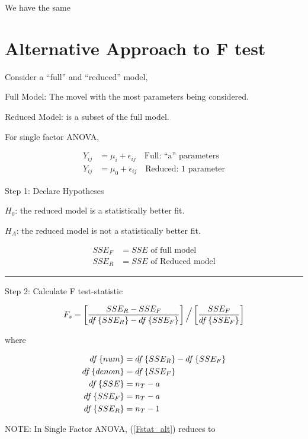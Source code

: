 \documentclass[10pt]{article}
\newcommand{\define}[1]{\colorbox{Thistle2}{#1}}
\newcommand{\emphas}[1]{\colorbox{DarkSeaGreen2}{#1}}
\newcommand{\mean}[1]{\mu_{#1}}
\newcommand{\err}[1]{\epsilon_{#1}}
\newcommand{\drawline}{\noindent\rule{\linewidth}{0.1pt}}
\begin{document}
\begin{multicols}{3}
    We have the same 

    \section{Alternative Approach to F test}

    Consider a ``full'' and ``reduced'' model,

    \define{Full Model:} The movel with the most parameters being considered.

    \define{Reduced Model:} is a subset of the full model.

    For single factor ANOVA, 

    \begin{align}
        Y_{ij} & = \mean{i} + \err{ij} \quad \text{Full: ``a'' parameters} \\
        Y_{ij} & = \mean{0} + \err{ij} \quad \text{Reduced: 1 parameter}
    \end{align}

    Step 1: Declare Hypotheses

    $H_0$: the reduced model is a statistically better fit.

    $H_A$: the reduced model is not a statistically better fit.

    \begin{align}
        SSE_F & = SSE \text{ of full model} \\
        SSE_R & = SSE \text{ of Reduced model} 
    \end{align}

    \drawline

    Step 2: Calculate F test-statistic

    \begin{equation}\label{Fstat_alt}
        F_s = \left[\frac{SSE_R - SSE_F}{df\left\{SSE_R\right\} - df\left\{SSE_F\right\}}\right] \Big/ \left[\frac{SSE_F}{df\left\{SSE_F\right\}}\right]
    \end{equation}

    where 

    \begin{align}
        df\left\{num\right\} & = df\left\{SSE_R\right\} - df\left\{SSE_F\right\} \\
        df\left\{denom\right\} & = df\left\{SSE_F\right\} \\
        df\left\{SSE\right\} & = n_T - a \\
        df\left\{SSE_F\right\} & = n_T - a \\
        df\left\{SSE_R\right\} & = n_T - 1 
    \end{align}

    NOTE: In \emphas{Single Factor ANOVA}, (\ref{Fstat_alt}) reduces to 


\end{multicols}
\end{document}
